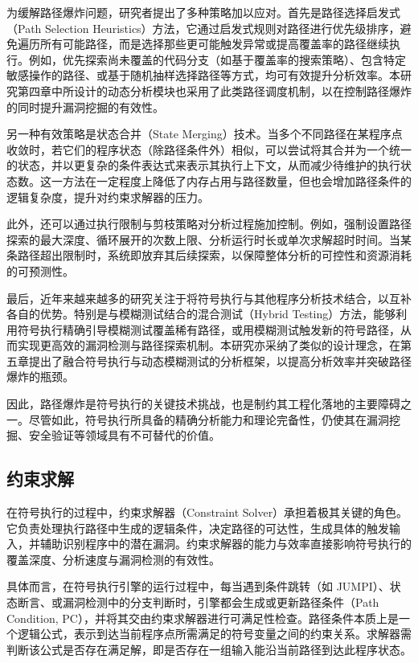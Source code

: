 \documentclass[print, master, vlined, timesmath]{DissertUESTC}
\begin{document}
为缓解路径爆炸问题，研究者提出了多种策略加以应对。首先是路径选择启发式\textsuperscript{\cite{Chen2018dynamic}}（Path Selection Heuristics）方法，它通过启发式规则对路径进行优先级排序，避免遍历所有可能路径，而是选择那些更可能触发异常或提高覆盖率的路径继续执行。例如，优先探索尚未覆盖的代码分支（如基于覆盖率的搜索策略）、包含特定敏感操作的路径、或基于随机抽样选择路径等方式，均可有效提升分析效率。本研究第四章中所设计的动态分析模块也采用了此类路径调度机制，以在控制路径爆炸的同时提升漏洞挖掘的有效性。

另一种有效策略是状态合并\textsuperscript{\cite{zhang2024compiler}}（State Merging）技术。当多个不同路径在某程序点收敛时，若它们的程序状态（除路径条件外）相似，可以尝试将其合并为一个统一的状态，并以更复杂的条件表达式来表示其执行上下文，从而减少待维护的执行状态数。这一方法在一定程度上降低了内存占用与路径数量，但也会增加路径条件的逻辑复杂度，提升对约束求解器的压力。

此外，还可以通过执行限制与剪枝策略对分析过程施加控制。例如，强制设置路径探索的最大深度、循环展开的次数上限、分析运行时长或单次求解超时时间。当某条路径超出限制时，系统即放弃其后续探索，以保障整体分析的可控性和资源消耗的可预测性。

最后，近年来越来越多的研究关注于将符号执行与其他程序分析技术结合，以互补各自的优势\textsuperscript{\cite{liang2025vulseye}}\textsuperscript{\cite{wu2024we}}\textsuperscript{\cite{han2024ethchecker}}。特别是与模糊测试结合的混合测试（Hybrid Testing）方法，能够利用符号执行精确引导模糊测试覆盖稀有路径，或用模糊测试触发新的符号路径，从而实现更高效的漏洞检测与路径探索机制。本研究亦采纳了类似的设计理念，在第五章提出了融合符号执行与动态模糊测试的分析框架，以提高分析效率并突破路径爆炸的瓶颈。

因此，路径爆炸是符号执行的关键技术挑战，也是制约其工程化落地的主要障碍之一。尽管如此，符号执行所具备的精确分析能力和理论完备性，仍使其在漏洞挖掘、安全验证等领域具有不可替代的价值。

\subsection{约束求解}

在符号执行的过程中，约束求解器\textsuperscript{\cite{barrett2024satisfiability}}（Constraint Solver）承担着极其关键的角色。它负责处理执行路径中生成的逻辑条件，决定路径的可达性，生成具体的触发输入，并辅助识别程序中的潜在漏洞。约束求解器的能力与效率直接影响符号执行的覆盖深度、分析速度与漏洞检测的有效性\textsuperscript{\cite{shuai2024partial}}。

具体而言，在符号执行引擎的运行过程中，每当遇到条件跳转（如 JUMPI）、状态断言、或漏洞检测中的分支判断时，引擎都会生成或更新路径条件（Path Condition, PC），并将其交由约束求解器进行可满足性检查。路径条件本质上是一个逻辑公式，表示到达当前程序点所需满足的符号变量之间的约束关系。求解器需判断该公式是否存在满足解，即是否存在一组输入能沿当前路径到达此程序状态。
\end{document}
